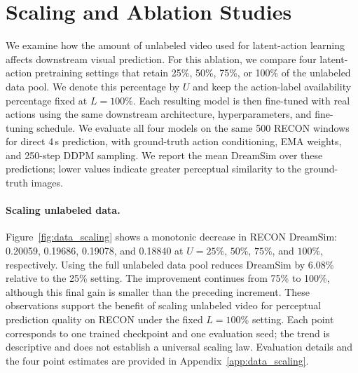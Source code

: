 \section{Scaling and Ablation Studies}
\label{sec:scaling_ablation}

We examine how the amount of unlabeled video used for latent-action
learning affects downstream visual prediction. For this ablation, we
compare four latent-action pretraining settings that retain 25\%, 50\%,
75\%, or 100\% of the unlabeled data pool. We denote this percentage by
$U$ and keep the action-label availability percentage fixed at $L=100\%$.
Each resulting model is then fine-tuned with real actions using the same
downstream architecture, hyperparameters, and fine-tuning schedule.
We evaluate all four models on the same 500 RECON windows for direct
4\,s prediction, with ground-truth action conditioning, EMA weights,
and 250-step DDPM sampling. We report the mean DreamSim over these
predictions; lower values indicate greater perceptual similarity to
the ground-truth images.



\paragraph{Scaling unlabeled data.}
Figure~\ref{fig:data_scaling} shows a monotonic decrease in RECON
DreamSim: 0.20059, 0.19686, 0.19078, and 0.18840 at $U=25\%$, $50\%$,
$75\%$, and $100\%$, respectively. Using the full unlabeled data pool
reduces DreamSim by 6.08\% relative to the 25\% setting. The improvement
continues from 75\% to 100\%, although this final gain is smaller than
the preceding increment. These observations support the benefit of
scaling unlabeled video for perceptual prediction quality on RECON
under the fixed $L=100\%$ setting. Each point corresponds to one trained
checkpoint and one evaluation seed; the trend is descriptive and does
not establish a universal scaling law. Evaluation details and the four
point estimates are provided in Appendix~\ref{app:data_scaling}.

